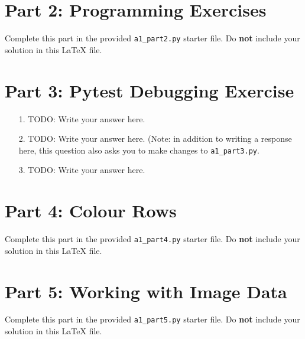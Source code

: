 \documentclass[12pt]{article}
\begin{document}
\section*{Part 2: Programming Exercises}

Complete this part in the provided \texttt{a1\_part2.py} starter file.
Do \textbf{not} include your solution in this LaTeX file.

\section*{Part 3: Pytest Debugging Exercise}


\begin{enumerate}
\item[1.]
TODO: Write your answer here.

\item[2.]
TODO: Write your answer here. (Note: in addition to writing a response here, this question also asks you to make changes to \texttt{a1\_part3.py}.

\item[3.]
TODO: Write your answer here.
\end{enumerate}

\section*{Part 4: Colour Rows}

Complete this part in the provided \texttt{a1\_part4.py} starter file.
Do \textbf{not} include your solution in this LaTeX file.

\section*{Part 5: Working with Image Data}

Complete this part in the provided \texttt{a1\_part5.py} starter file.
Do \textbf{not} include your solution in this LaTeX file.
\end{document}
